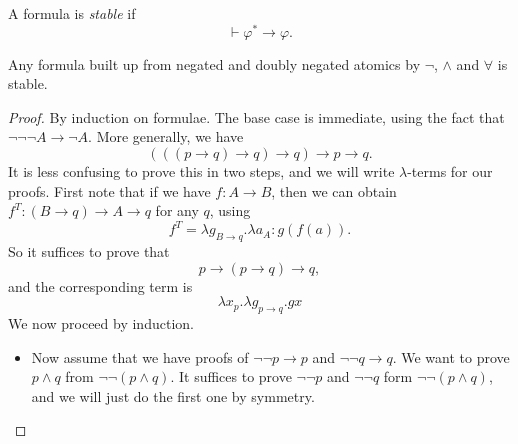 \documentclass[a4paper]{article}
\begin{document}
\begin{defi}
  A formula is \emph{stable} if
  \[
    \vdash \varphi^* \to \varphi.
  \]
\end{defi}

\begin{lemma}
  Any formula built up from negated and doubly negated atomics by $\neg$, $\wedge$ and $\forall$ is stable.
\end{lemma}

\begin{proof}
  By induction on formulae. The base case is immediate, using the fact that $\neg \neg \neg A \to \neg A$. More generally, we have
  \[
    (((p \to q) \to q) \to q) \to p \to q.
  \]
  It is less confusing to prove this in two steps, and we will write $\lambda$-terms for our proofs. First note that if we have $f: A \to B$, then we can obtain $f^T: (B \to q) \to A \to q$ for any $q$, using
  \[
    f^T = \lambda g_{B \to q}. \lambda a_A: g(f(a)).
  \]
  So it suffices to prove that
  \[
    p \to (p \to q) \to q,
  \]
  and the corresponding term is
  \[
    \lambda x_p. \lambda g_{p \to q}. g x
  \]
  We now proceed by induction.
  \begin{itemize}
    \item Now assume that we have proofs of $\neg \neg p \to p$ and $\neg \neg q \to q$. We want to prove $p \wedge q$ from $\neg \neg (p \wedge q)$. It suffices to prove $\neg \neg p$ and $\neg \neg q$ form $\neg \neg (p \wedge q)$, and we will just do the first one by symmetry.


\end{itemize}
\end{proof}
\end{document}

